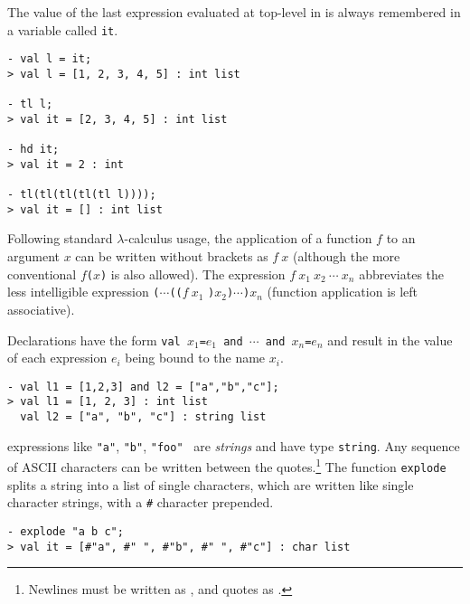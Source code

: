 The value of the last expression evaluated at top-level in \ML{} is always
remembered in a variable called {\small\verb|it|}.

\begin{session}
\begin{verbatim}
- val l = it;
> val l = [1, 2, 3, 4, 5] : int list

- tl l;
> val it = [2, 3, 4, 5] : int list

- hd it;
> val it = 2 : int

- tl(tl(tl(tl(tl l))));
> val it = [] : int list
\end{verbatim}
\end{session}

Following standard $\lambda$-calculus usage, the application of a
function $f$ to an argument $x$ can be written without brackets as $f\
x$ (although the more conventional
$f${\small\verb|(|}$x${\small\verb|)|} is also allowed).  The
expression $f\ x_1\ x_2\ \cdots\ x_n$ abbreviates the less
intelligible expression {\small\verb|(|}$\cdots${\small\verb|((|}$f\ x_1$%
{\small\verb|)|}$x_2${\small\verb|)|}$\cdots${\small\verb|)|}$x_n$
(function application is left associative).

Declarations have the form {\small\verb|val |}$x_1${\small\verb|=|}$e_1${\small\verb| and |}$\cdots
${\small\verb| and |}$x_n${\small\verb|=|}$e_n$ and result in the value of
each expression $e_i$ being bound to the name $x_i$.

\begin{session}
\begin{verbatim}
- val l1 = [1,2,3] and l2 = ["a","b","c"];
> val l1 = [1, 2, 3] : int list
  val l2 = ["a", "b", "c"] : string list
\end{verbatim}
\end{session}

\ML{} expressions like {\small\verb|"a"|}, {\small\verb|"b"|},
{\small\verb|"foo"|} \etc\ are {\it strings\/} and have type
{\small\verb|string|}. Any sequence of {\small ASCII} characters can
be written between the quotes.\footnote{Newlines must be written as
  \ml{$\backslash$n}, and quotes as \ml{$\backslash$"}.} The function
{\small\verb|explode|} splits a string into a list of single
characters, which are written like single character strings, with a
{\small\verb|#|} character prepended.

\begin{session}
\begin{verbatim}
- explode "a b c";
> val it = [#"a", #" ", #"b", #" ", #"c"] : char list
\end{verbatim}
\end{session}

